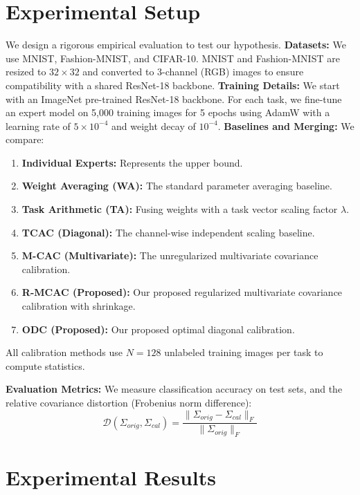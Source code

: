 \documentclass{article}
\theoremstyle{plain}
\theoremstyle{definition}
\theoremstyle{remark}
\begin{document}
\section{Experimental Setup}
\label{sec:experiments}

We design a rigorous empirical evaluation to test our hypothesis.
\textbf{Datasets:} We use MNIST, Fashion-MNIST, and CIFAR-10. MNIST and Fashion-MNIST are resized to $32 \times 32$ and converted to 3-channel (RGB) images to ensure compatibility with a shared ResNet-18 backbone.
\textbf{Training Details:} We start with an ImageNet pre-trained ResNet-18 backbone. For each task, we fine-tune an expert model on 5,000 training images for 5 epochs using AdamW with a learning rate of $5 \times 10^{-4}$ and weight decay of $10^{-4}$.
\textbf{Baselines and Merging:} We compare:
\begin{enumerate}
  \item \textbf{Individual Experts:} Represents the upper bound.
  \item \textbf{Weight Averaging (WA):} The standard parameter averaging baseline.
  \item \textbf{Task Arithmetic (TA):} Fusing weights with a task vector scaling factor $\lambda$.
  \item \textbf{TCAC (Diagonal):} The channel-wise independent scaling baseline.
  \item \textbf{M-CAC (Multivariate):} The unregularized multivariate covariance calibration.
  \item \textbf{R-MCAC (Proposed):} Our proposed regularized multivariate covariance calibration with shrinkage.
  \item \textbf{ODC (Proposed):} Our proposed optimal diagonal calibration.
\end{enumerate}
All calibration methods use $N=128$ unlabeled training images per task to compute statistics.

\textbf{Evaluation Metrics:} We measure classification accuracy on test sets, and the relative covariance distortion (Frobenius norm difference):
\begin{equation}
  \mathcal{D}(\Sigma_{orig}, \Sigma_{cal}) = \frac{\|\Sigma_{orig} - \Sigma_{cal}\|_F}{\|\Sigma_{orig}\|_F}
\end{equation}

\section{Experimental Results}
\label{sec:results}
\end{document}

